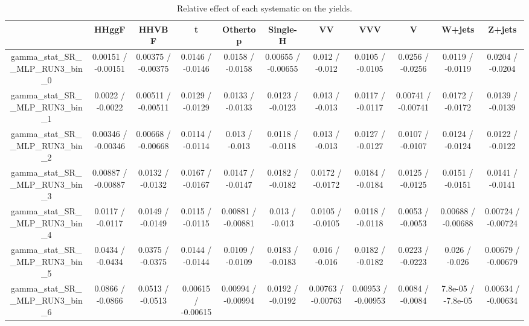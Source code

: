 \documentclass[10pt]{article}
\begin{document}
\begin{table}[htbp]
\begin{center}
\begin{tabular}{|c|c|c|c|c|c|c|c|c|c|c|}
\hline 
      & HHggF      & HHVBF      & t      & Othertop      & Single-H      & VV      & VVV      & V      & W+jets      & Z+jets \\ 
\hline 
  gamma_stat_SR__MLP_RUN3_bin_0 & 0.00151 / -0.00151 & 0.00375 / -0.00375 & 0.0146 / -0.0146 & 0.0158 / -0.0158 & 0.00655 / -0.00655 & 0.012 / -0.012 & 0.0105 / -0.0105 & 0.0256 / -0.0256 & 0.0119 / -0.0119 & 0.0204 / -0.0204 \\ 
  gamma_stat_SR__MLP_RUN3_bin_1 & 0.0022 / -0.0022 & 0.00511 / -0.00511 & 0.0129 / -0.0129 & 0.0133 / -0.0133 & 0.0123 / -0.0123 & 0.013 / -0.013 & 0.0117 / -0.0117 & 0.00741 / -0.00741 & 0.0172 / -0.0172 & 0.0139 / -0.0139 \\ 
  gamma_stat_SR__MLP_RUN3_bin_2 & 0.00346 / -0.00346 & 0.00668 / -0.00668 & 0.0114 / -0.0114 & 0.013 / -0.013 & 0.0118 / -0.0118 & 0.013 / -0.013 & 0.0127 / -0.0127 & 0.0107 / -0.0107 & 0.0124 / -0.0124 & 0.0122 / -0.0122 \\ 
  gamma_stat_SR__MLP_RUN3_bin_3 & 0.00887 / -0.00887 & 0.0132 / -0.0132 & 0.0167 / -0.0167 & 0.0147 / -0.0147 & 0.0182 / -0.0182 & 0.0172 / -0.0172 & 0.0184 / -0.0184 & 0.0125 / -0.0125 & 0.0151 / -0.0151 & 0.0141 / -0.0141 \\ 
  gamma_stat_SR__MLP_RUN3_bin_4 & 0.0117 / -0.0117 & 0.0149 / -0.0149 & 0.0115 / -0.0115 & 0.00881 / -0.00881 & 0.013 / -0.013 & 0.0105 / -0.0105 & 0.0118 / -0.0118 & 0.0053 / -0.0053 & 0.00688 / -0.00688 & 0.00724 / -0.00724 \\ 
  gamma_stat_SR__MLP_RUN3_bin_5 & 0.0434 / -0.0434 & 0.0375 / -0.0375 & 0.0144 / -0.0144 & 0.0109 / -0.0109 & 0.0183 / -0.0183 & 0.016 / -0.016 & 0.0182 / -0.0182 & 0.0223 / -0.0223 & 0.026 / -0.026 & 0.00679 / -0.00679 \\ 
  gamma_stat_SR__MLP_RUN3_bin_6 & 0.0866 / -0.0866 & 0.0513 / -0.0513 & 0.00615 / -0.00615 & 0.00994 / -0.00994 & 0.0192 / -0.0192 & 0.00763 / -0.00763 & 0.00953 / -0.00953 & 0.0084 / -0.0084 & 7.8e-05 / -7.8e-05 & 0.00634 / -0.00634 \\ 
\hline 
\end{tabular} 
\caption{Relative effect of each systematic on the yields.} 
\end{center} 
\end{table} 
\end{document}
